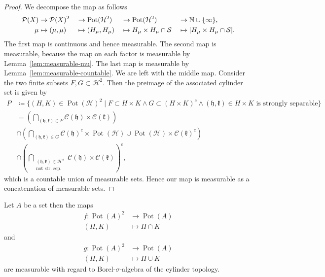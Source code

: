 \begin{proof}
  We decompose the map as follows
  \begin{alignat*}{4}
    \mathcal{P}(\bar X) &\to \mathcal{P}(\bar X)^2&&\to \operatorname{Pot}(\mathcal{H}^2) &&\to \operatorname{Pot}(\mathcal{H}^2) &&\to \mathbb{N} \cup \{\infty\},\\
    \mu &\mapsto (\mu, \mu) &&\mapsto (H_\mu, H_\mu)&&\mapsto H_\mu \times H_\mu \cap \mathcal{S} &&\mapsto |H_\mu \times H_\mu \cap \mathcal{S}|.
  \end{alignat*}
  The first map is continuous and hence measurable. The second map is measurable, because the map on each factor is measurable by Lemma~\ref{lem:measurable-mu}. The last map is measurable by Lemma~\ref{lem:measurable-countable}. We are left with the middle map. Consider the two finite subsets \(F, G \subset \mathcal{H}^2\). Then the preimage of the associated cylinder set is given by
  \begin{align*}
    P & \coloneqq \{(H, K) \in \operatorname{Pot}(\mathcal{H})^2 \mid F \subset H \times K \wedge G \subset (H \times K)^c \wedge (\mathfrak{h}, \mathfrak{k}) \in H \times K \text{ is strongly separable}\}\\
      & = \left (\bigcap_{(\mathfrak{h},\mathfrak{k}) \in F} \mathcal{C}(\mathfrak{h}) \times \mathcal{C}(\mathfrak{k})\right)\\
      & \cap \left (\bigcap_{(\mathfrak{h},\mathfrak{k}) \in G} \mathcal{C}(\mathfrak{h})^c \times \operatorname{Pot}(\mathcal{H}) \cup \operatorname{Pot}(\mathcal{H}) \times \mathcal{C}(\mathfrak{k})^c \right)\\
      & \cap \left( \bigcap_{\substack{(\mathfrak{h}, \mathfrak{k}) \in \mathcal{H}^2\\\text{not str.\ sep.}}} \mathcal{C}(\mathfrak{h}) \times \mathcal{C}(\mathfrak{k})\right)^c,
  \end{align*}
  which is a countable union of measurable sets. Hence our map is measurable as a concatenation of measurable sets.
\end{proof}

\begin{lemma}
  Let \(A\) be a set then the maps
  \begin{align*}
    f \colon \operatorname{Pot}(A)^2 & \to \operatorname{Pot}(A)\\
    (H, K) & \mapsto H \cap K
  \end{align*}
  and
  \begin{align*}
    g \colon \operatorname{Pot}(A)^2 & \to \operatorname{Pot}(A)\\
    (H, K) & \mapsto H \cup K
  \end{align*}
  are measurable with regard to Borel-\(\sigma\)-algebra of the cylinder topology.
\end{lemma}

